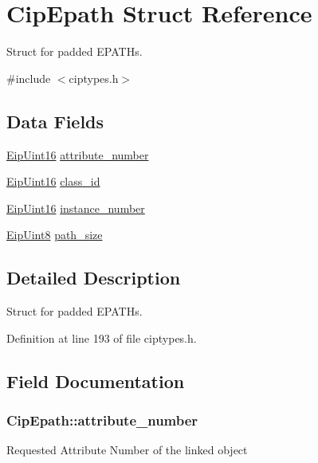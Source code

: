 \hypertarget{structCipEpath}{\section{\-Cip\-Epath \-Struct \-Reference}
\label{d5/dd2/structCipEpath}
}


\-Struct for padded \-E\-P\-A\-T\-Hs.  




{\ttfamily \#include $<$ciptypes.\-h$>$}

\subsection*{\-Data \-Fields}
\begin{DoxyCompactItemize}
\item 
\hyperlink{typedefs_8h_ac1b4cfa25b4f5def62f23b455dd395d8}{\-Eip\-Uint16} \hyperlink{structCipEpath_a4c9dee9e353080f53bcc041745849bbe}{attribute\-\_\-number}
\item 
\hyperlink{typedefs_8h_ac1b4cfa25b4f5def62f23b455dd395d8}{\-Eip\-Uint16} \hyperlink{structCipEpath_afa1bed6dacf38bea9ec26342f33f4fc6}{class\-\_\-id}
\item 
\hyperlink{typedefs_8h_ac1b4cfa25b4f5def62f23b455dd395d8}{\-Eip\-Uint16} \hyperlink{structCipEpath_a206c078bbda5b614b96cd61fd18d1cab}{instance\-\_\-number}
\item 
\hyperlink{typedefs_8h_aa0c108ee762a27720919a4634643040e}{\-Eip\-Uint8} \hyperlink{structCipEpath_af99160e384c9add3cd99fa48f1c83059}{path\-\_\-size}
\end{DoxyCompactItemize}


\subsection{\-Detailed \-Description}
\-Struct for padded \-E\-P\-A\-T\-Hs. 



\-Definition at line 193 of file ciptypes.\-h.



\subsection{\-Field \-Documentation}
\hypertarget{structCipEpath_a4c9dee9e353080f53bcc041745849bbe}{
\subsubsection[{attribute\-\_\-number}]{ {\bf \-Cip\-Epath\-::attribute\-\_\-number}}}\label{d5/dd2/structCipEpath_a4c9dee9e353080f53bcc041745849bbe}
\-Requested \-Attribute \-Number of the linked object 

